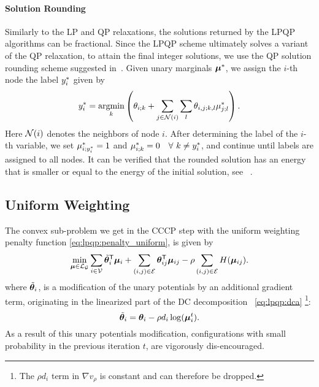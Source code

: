 \paragraph{Solution Rounding} 
Similarly to the \ac{LP} and \ac{QP} relaxations, the solutions returned by the \ac{LPQP} algorithms 
can be fractional. Since the \ac{LPQP} scheme ultimately solves a variant of the
\ac{QP}
relaxation, to attain the final integer solutions, we use the 
\ac{QP} solution rounding scheme suggested in~\parencite{Ravikumar2006}. 
Given unary marginals $\bm{\mu}^{*}$, we assign the $i$-th node the label 
$y_i^{*}$ given by
\[
    \outputvar_i^{*} = \argmin_{k} \left ( \potential_{i;k} +
    \sum_{j\in\neighborhood(i)} \sum_{l} \potential_{i,j;k,l} \marginalvar_{j;l}^{*} \right ).
\]
Here $\mathcal{N}(i)$ denotes the neighbors of node $i$. After determining
the label of the $i$-th variable, we set
$\mu^{*}_{i;y_i^{*}} = 1$ and $\mu^{*}_{i;k} = 0 \quad
\forall \ k \neq y_i^{*}$,
and continue until labels are assigned to all nodes. 
It can be verified that the rounded solution has an energy that is smaller
or equal to the energy of the initial solution, see ~\parencite{Ravikumar2006}.

\subsection{Uniform Weighting}
\label{sec:lpqp:npbp}

The convex sub-problem we get in the \ac{CCCP} step with the uniform weighting
penalty function \eqref{eq:lpqp:penalty_uniform}, is given by
\begin{equation}
    \min_{\bm{\mu}\in\mathcal{L}_{\mathcal{G}}} \sum_{i\in\mathcal{V}}
    \tilde{\bm{\theta}}_{i}^{\mathsf{T}}\bm{\mu}_{i} 
    + \sum_{(i,j) \in \mathcal{E}} \bm{\theta}_{ij}^{\mathsf{T}}
    \bm{\mu}_{ij}
    -\rho\sum_{(i,j) \in \mathcal{E}} H(\bm{\mu}_{ij}).
    \label{eq:lpqp:inner_combined_objective_uniform}
\end{equation}
where $\tilde{\bm{\theta}}_{i}$, is a modification of the unary potentials
by an additional gradient term, originating in the linearized part of the
\ac{DC} 
decomposition ~\eqref{eq:lpqp:dca} \footnote{The $\rho d_i$ term in
$\nabla v_{\rho}$ is constant and can therefore be dropped.}:
\begin{equation}
    \tilde{\bm{\theta}}_{i} = \bm{\theta}_{i} -
    \rho d_i \log(\bm{\mu}^{t}_{i}).
\end{equation}
As a result of this unary potentials modification, configurations with small probability 
in the previous iteration $t$, are vigorously dis-en\-couraged. 

